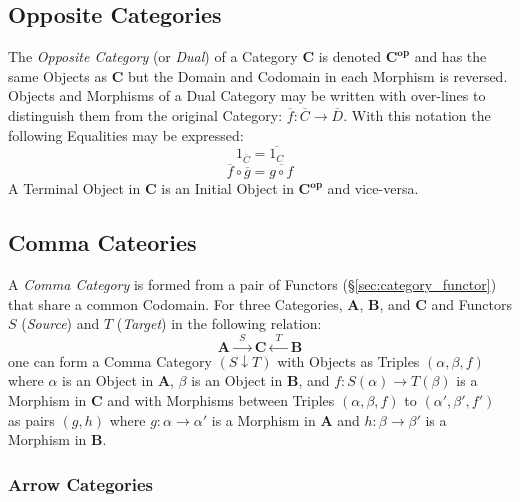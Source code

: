 \subsection{Opposite Categories}\label{subsec:opposite_categories}

The \emph{Opposite Category} (or \emph{Dual}) of a Category
$\mathbf{C}$ is denoted $\mathbf{C^{op}}$ and has the same Objects as
$\mathbf{C}$ but the Domain and Codomain in each Morphism is
reversed. Objects and Morphisms of a Dual Category may be written with
over-lines to distinguish them from the original Category:
$\overline{f}: \overline{C} \rightarrow \overline{D}$. With this
notation the following Equalities may be expressed:
\[
    1_{\overline{C}} = \overline{1_C}
\]\[
    \overline{f} \circ \overline{g} = \overline{g \circ f}
\]
A Terminal Object in $\mathbf{C}$ is an Initial Object in
$\mathbf{C^{op}}$ and vice-versa.

\subsection{Comma Cateories}\label{subsec:comma_categories}

A \emph{Comma Category} is formed from a pair of Functors
(\S\ref{sec:category_functor}) that share a common Codomain. For three
Categories, $\mathbf{A}$, $\mathbf{B}$, and $\mathbf{C}$ and Functors
$S$ (\emph{Source}) and $T$ (\emph{Target}) in the following relation:
\[
    \mathbf{A} \xrightarrow{\;\; S\;\;} \mathbf{C} \xleftarrow{\;\;
      T\;\;} \mathbf{B}
\]
one can form a Comma Category $(S \downarrow T)$ with Objects as
Triples $(\alpha, \beta, f)$ where $\alpha$ is an Object in
$\mathbf{A}$, $\beta$ is an Object in $\mathbf{B}$, and $f : S(\alpha)
\rightarrow T(\beta)$ is a Morphism in $\mathbf{C}$ and with Morphisms
between Triples $(\alpha, \beta, f)$ to $(\alpha', \beta', f')$ as
pairs $(g,h)$ where $g : \alpha \rightarrow \alpha'$ is a Morphism in
$\mathbf{A}$ and $h : \beta \rightarrow \beta'$ is a Morphism in
$\mathbf{B}$.

\subsubsection{Arrow Categories}\label{subsec:arrow_categories}

